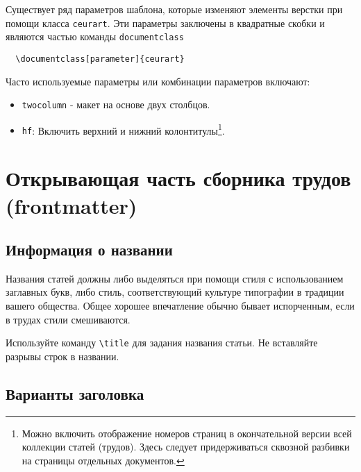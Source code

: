 \documentclass[
12pt,
polyglossia,   %
wordmath,      %
]{isdctart}
\begin{document}
Существует ряд параметров шаблона, которые изменяют элементы верстки при помощи класса \verb|ceurart|. Эти параметры заключены в квадратные скобки и являются частью команды {\verb|documentclass|}
\begin{verbatim}
  \documentclass[parameter]{ceurart}
\end{verbatim}

Часто используемые параметры или комбинации параметров включают:
\begin{itemize}
\item {\verb|twocolumn|} - макет на основе двух столбцов.
\item {\verb|hf|}: Включить верхний и нижний колонтитулы\footnote{Можно включить отображение номеров страниц в окончательной версии всей коллекции статей (трудов). Здесь следует придерживаться сквозной разбивки на страницы отдельных документов.}.
\end{itemize}

\section{Открывающая часть сборника трудов (frontmatter)}

\subsection{Информация о названии}

Названия статей должны либо выделяться при помощи стиля с использованием заглавных букв, либо стиль, соответствующий культуре типографии в традиции вашего общества. Общее хорошее впечатление обычно бывает испорченным, если в трудах стили смешиваются.

Используйте команду \verb|\title| для задания названия статьи. Не вставляйте разрывы строк в названии.

\subsection{Варианты заголовка}
\end{document}
